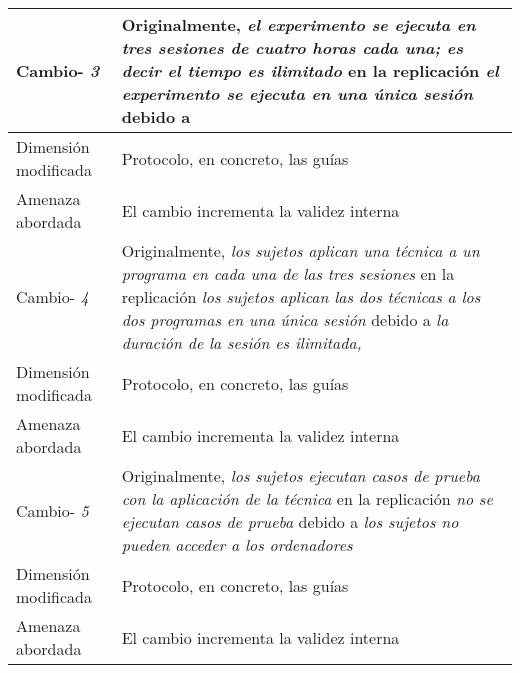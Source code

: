 \begin{table}
\begin{tabular}{| p{3.3cm} | p{9cm} |}
Cambio- \textit{3}   & \parbox[t]{9cm} {Originalmente,  \textit{ el experimento se ejecuta en tres sesiones de cuatro horas cada una; es decir el tiempo es ilimitado } } \parbox[t]{9cm}{en la replicación \textit{ el experimento se ejecuta en una única sesión } }  debido a  \textit{  } \\  \hline
Dimensión modificada & 
Protocolo, en concreto, las guías \\  \hline 
Amenaza abordada  & El cambio incrementa la validez interna  \\  \hline \hline

Cambio- \textit{4}   & \parbox[t]{9cm} {Originalmente,  \textit{los sujetos aplican una técnica a un programa en cada una de las tres sesiones} } \parbox[t]{9cm}{en la replicación \textit{los sujetos aplican las dos técnicas a los dos programas en una única sesión} }  debido a  \textit{la duración de la sesión es ilimitada, } \\  \hline
Dimensión modificada & 
Protocolo, en concreto, las guías \\  \hline 
Amenaza abordada  & El cambio incrementa la validez interna  \\  \hline \hline

Cambio- \textit{5}   & \parbox[t]{9cm} {Originalmente,  \textit{los sujetos ejecutan casos de prueba con la aplicación de la técnica} } \parbox[t]{9cm}{en la replicación \textit{no se ejecutan casos de prueba} }  debido a  \textit{los sujetos no pueden acceder a los ordenadores } \\  \hline
Dimensión modificada & 
Protocolo, en concreto, las guías \\  \hline 
Amenaza abordada  & El cambio incrementa la validez interna  \\  \hline
 
\end{tabular}
\label{tab:plantillaORT}
\end{table}





